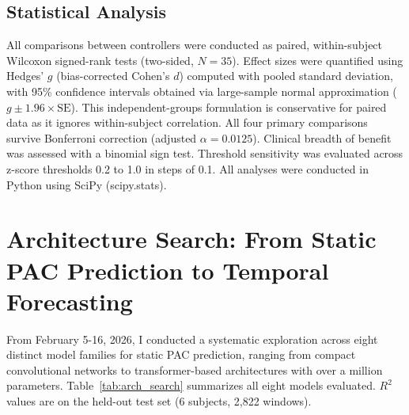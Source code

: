 \documentclass[11pt,letterpaper]{article}
\begin{document}
\subsection{Statistical Analysis}

All comparisons between controllers were conducted as paired, within-subject Wilcoxon signed-rank tests (two-sided, $N = 35$). Effect sizes were quantified using Hedges' $g$ (bias-corrected Cohen's $d$) computed with pooled standard deviation, with 95\% confidence intervals obtained via large-sample normal approximation ($g \pm 1.96 \times \text{SE}$). This independent-groups formulation is conservative for paired data as it ignores within-subject correlation. All four primary comparisons survive Bonferroni correction (adjusted $\alpha = 0.0125$). Clinical breadth of benefit was assessed with a binomial sign test. Threshold sensitivity was evaluated across z-score thresholds 0.2 to 1.0 in steps of 0.1. All analyses were conducted in Python using SciPy (scipy.stats).

\section{Architecture Search: From Static PAC Prediction to Temporal Forecasting}

From February 5-16, 2026, I conducted a systematic exploration across eight distinct model families for static PAC prediction, ranging from compact convolutional networks to transformer-based architectures with over a million parameters. Table~\ref{tab:arch_search} summarizes all eight models evaluated. $R^2$ values are on the held-out test set (6 subjects, 2,822 windows).
\end{document}
